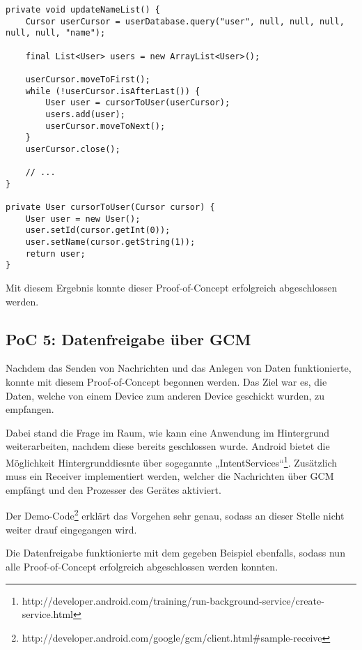 \begin{lstlisting}[label=ls:user-table-cursor,caption=Auslesen aller Benutzer aus einer User-Tabelle]
private void updateNameList() {
	Cursor userCursor = userDatabase.query("user", null, null, null, null, null, "name");

	final List<User> users = new ArrayList<User>();

	userCursor.moveToFirst();
	while (!userCursor.isAfterLast()) {
		User user = cursorToUser(userCursor);
		users.add(user);
		userCursor.moveToNext();
	}
	userCursor.close();

	// ...
}

private User cursorToUser(Cursor cursor) {
	User user = new User();
	user.setId(cursor.getInt(0));
	user.setName(cursor.getString(1));
	return user;
}
\end{lstlisting}

Mit diesem Ergebnis konnte dieser Proof-of-Concept erfolgreich abgeschlossen werden.

\subsection{PoC 5: Datenfreigabe über GCM}

Nachdem das Senden von Nachrichten und das Anlegen von Daten funktionierte, konnte mit diesem Proof-of-Concept begonnen werden. Das Ziel war es, die Daten, welche von einem Device zum anderen Device geschickt wurden, zu empfangen.

Dabei stand die Frage im Raum, wie kann eine Anwendung im Hintergrund weiterarbeiten, nachdem diese bereits geschlossen wurde. Android bietet die Möglichkeit Hintergrunddiesnte über sogegannte „IntentServices“\footnote{http://developer.android.com/training/run-background-service/create-service.html}. Zusätzlich muss ein Receiver implementiert werden, welcher die Nachrichten über GCM empfängt und den Prozesser des Gerätes aktiviert.

Der Demo-Code\footnote{http://developer.android.com/google/gcm/client.html\#sample-receive} erklärt das Vorgehen sehr genau, sodass an dieser Stelle nicht weiter drauf eingegangen wird.

Die Datenfreigabe funktionierte mit dem gegeben Beispiel ebenfalls, sodass nun alle Proof-of-Concept erfolgreich abgeschlossen werden konnten.

